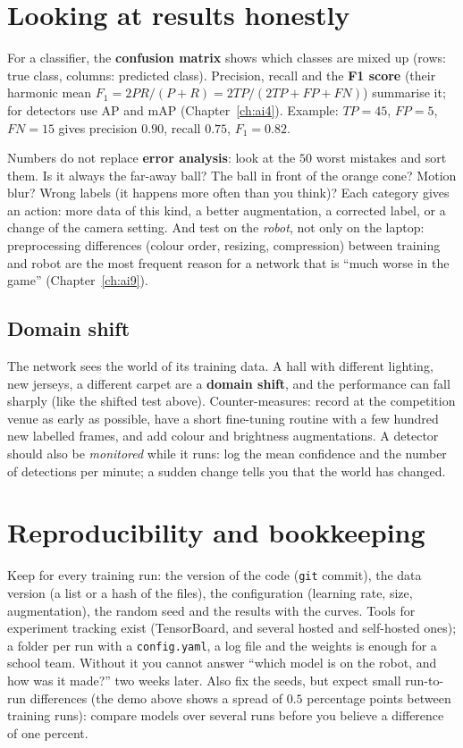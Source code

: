 \section*{Looking at results honestly}
For a classifier, the \textbf{confusion matrix} shows which classes are mixed up (rows: true class, columns: predicted class). Precision, recall and the \textbf{F1 score} (their harmonic mean $F_1=2PR/(P+R)=2TP/(2TP+FP+FN)$) summarise it; for detectors use AP and mAP (Chapter~\ref{ch:ai4}). Example: $TP=45$, $FP=5$, $FN=15$ gives precision $0.90$, recall $0.75$, $F_1=0.82$.

Numbers do not replace \textbf{error analysis}: look at the $50$ worst mistakes and sort them. Is it always the far-away ball? The ball in front of the orange cone? Motion blur? Wrong labels (it happens more often than you think)? Each category gives an action: more data of this kind, a better augmentation, a corrected label, or a change of the camera setting. And test on the \emph{robot}, not only on the laptop: preprocessing differences (colour order, resizing, compression) between training and robot are the most frequent reason for a network that is ``much worse in the game'' (Chapter~\ref{ch:ai9}).

\subsection*{Domain shift}
The network sees the world of its training data. A hall with different lighting, new jerseys, a different carpet are a \textbf{domain shift}, and the performance can fall sharply (like the shifted test above). Counter-measures: record at the competition venue as early as possible, have a short fine-tuning routine with a few hundred new labelled frames, and add colour and brightness augmentations. A detector should also be \emph{monitored} while it runs: log the mean confidence and the number of detections per minute; a sudden change tells you that the world has changed.

\section*{Reproducibility and bookkeeping}
Keep for every training run: the version of the code (\texttt{git} commit), the data version (a list or a hash of the files), the configuration (learning rate, size, augmentation), the random seed and the results with the curves. Tools for experiment tracking exist (TensorBoard, and several hosted and self-hosted ones); a folder per run with a \texttt{config.yaml}, a log file and the weights is enough for a school team. Without it you cannot answer ``which model is on the robot, and how was it made?'' two weeks later. Also fix the seeds, but expect small run-to-run differences (the demo above shows a spread of $0.5$ percentage points between training runs): compare models over several runs before you believe a difference of one percent.

